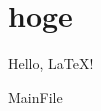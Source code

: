 \documentclass[a4paper,11pt]{ltjsarticle}
\begin{document}
\fi

\section{hoge}
	Hello, \LaTeX!


\ifcsname MainFile\endcsname\else
\end{document}
